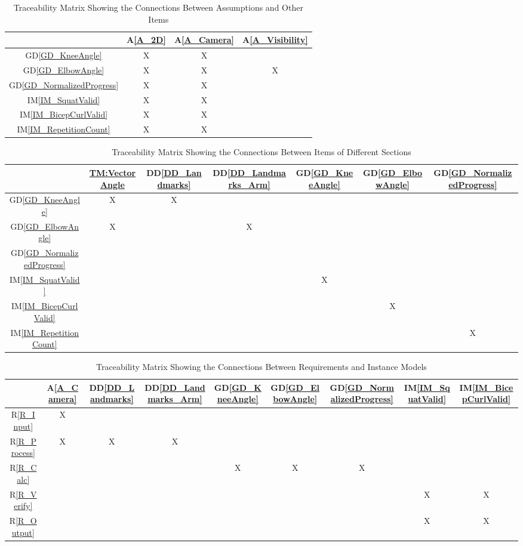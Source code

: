 \documentclass[12pt]{article}
\newcommand{\dref}[1]{GD\ref{#1}}
\newcommand{\ddref}[1]{DD\ref{#1}}
\newcommand{\aref}[1]{A\ref{#1}}
\newcommand{\iref}[1]{IM\ref{#1}}
\newcommand{\rref}[1]{R\ref{#1}}
\begin{document}
\begin{table}[h!]
\centering
\begin{tabular}{|c|c|c|c|}
\hline
	& \aref{A_2D}& \aref{A_Camera}& \aref{A_Visibility} \\
\hline
\dref{GD_KneeAngle}  & X & X & \\ \hline
\dref{GD_ElbowAngle} & X & X & X \\ \hline
\dref{GD_NormalizedProgress} & X & X & \\ \hline
\iref{IM_SquatValid} & X & X & \\ \hline
\iref{IM_BicepCurlValid} & X & X & \\ \hline
\iref{IM_RepetitionCount} & X & X & \\ \hline
\end{tabular}
\caption{Traceability Matrix Showing the Connections Between Assumptions and Other Items}
\label{Table:A_trace}
\end{table}

\begin{table}[h!]
\centering
\begin{tabular}{|c|c|c|c|c|c|c|}
\hline        
	& \hyperref[TM:VectorAngle]{TM:VectorAngle}& \ddref{DD_Landmarks}& \ddref{DD_Landmarks_Arm} & \dref{GD_KneeAngle} & \dref{GD_ElbowAngle} & \dref{GD_NormalizedProgress} \\
\hline
\dref{GD_KneeAngle}  & X & X & & & & \\ \hline
\dref{GD_ElbowAngle} & X & & X & & & \\ \hline
\dref{GD_NormalizedProgress} & & & & & & \\ \hline
\iref{IM_SquatValid} & & & & X & & \\ \hline
\iref{IM_BicepCurlValid} & & & & & X & \\ \hline
\iref{IM_RepetitionCount} & & & & & & X \\ \hline
\end{tabular}
\caption{Traceability Matrix Showing the Connections Between Items of Different Sections}
\label{Table:trace}
\end{table}

\begin{table}[h!]
\centering
\begin{tabular}{|c|c|c|c|c|c|c|c|c|}
\hline
	& \aref{A_Camera} & \ddref{DD_Landmarks}& \ddref{DD_Landmarks_Arm} & \dref{GD_KneeAngle}& \dref{GD_ElbowAngle} & \dref{GD_NormalizedProgress} & \iref{IM_SquatValid} & \iref{IM_BicepCurlValid} \\
\hline
\rref{R_Input}         & X & & & & & & & \\ \hline
\rref{R_Process}       & X & X & X & & & & & \\ \hline
\rref{R_Calc}          & & & & X & X & X & & \\ \hline
\rref{R_Verify}        & & & & & & & X & X \\ \hline
\rref{R_Output}        & & & & & & & X & X \\ \hline
\end{tabular}
\caption{Traceability Matrix Showing the Connections Between Requirements and Instance Models}
\label{Table:R_trace}
\end{table}
\end{document}
